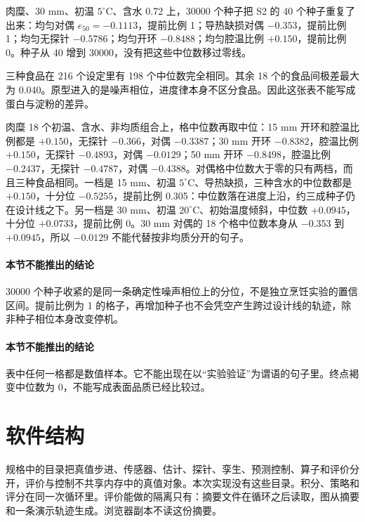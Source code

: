 肉糜、30 mm、初温 \(5^\circ\mathrm{C}\)、含水 0.72 上，30000 个种子把 S2 的 40 个种子重复了出来：均匀对偶 \(e_{50}=-0.1113\)，提前比例 1；导热缺损对偶 \(-0.353\)，提前比例 1；均匀无探针 \(-0.5786\)；均匀开环 \(-0.8488\)；均匀腔温比例 \(+0.150\)，提前比例 0。种子从 40 增到 30000，没有把这些中位数移过零线。

三种食品在 216 个设定里有 198 个中位数完全相同。其余 18 个的食品间极差最大为 0.040。原型进入的是噪声相位，进度律本身不区分食品。因此这张表不能写成蛋白与淀粉的差异。

肉糜 18 个初温、含水、非均质组合上，格中位数再取中位：15 mm 开环和腔温比例都是 \(+0.150\)，无探针 \(-0.366\)，对偶 \(-0.3387\)；30 mm 开环 \(-0.8382\)，腔温比例 \(+0.150\)，无探针 \(-0.4893\)，对偶 \(-0.0129\)；50 mm 开环 \(-0.8498\)，腔温比例 \(-0.2437\)，无探针 \(-0.4787\)，对偶 \(-0.4388\)。对偶格中位数大于零的只有两档，而且三种食品相同。一档是 15 mm、初温 \(5^\circ\mathrm{C}\)、导热缺损，三种含水的中位数都是 \(+0.150\)，十分位 \(-0.5255\)，提前比例 0.305：中位数落在进度上沿，约三成种子仍在设计线之下。另一档是 30 mm、初温 \(20^\circ\mathrm{C}\)、初始温度倾斜，中位数 \(+0.0945\)，十分位 \(+0.0733\)，提前比例 0。30 mm 对偶的 18 个格中位数本身从 \(-0.353\) 到 \(+0.0945\)，所以 \(-0.0129\) 不能代替按非均质分开的句子。

\paragraph{本节不能推出的结论}
30000 个种子收紧的是同一条确定性噪声相位上的分位，不是独立烹饪实验的置信区间。提前比例为 1 的格子，再增加种子也不会凭空产生跨过设计线的轨迹，除非种子相位本身改变停机。



\paragraph{本节不能推出的结论}
表中任何一格都是数值样本。它不能出现在以“实验验证”为谓语的句子里。终点褐变中位数为 0，不能写成表面品质已经比较过。

\section{软件结构}

规格中的目录把真值步进、传感器、估计、探针、孪生、预测控制、算子和评价分开，评价与控制不共享内存中的真值对象。本次实现没有这些目录。积分、策略和评分在同一次循环里。评价能做的隔离只有：摘要文件在循环之后读取，图从摘要和一条演示轨迹生成。浏览器副本不读这份摘要。

